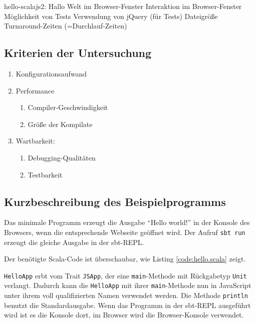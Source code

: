 \documentclass[a4paper, 12pt, hidelinks, listof=totoc, listoftables=totoc, bibliography=totoc]{scrreprt}
\begin{document}
hello-scalajs2:
Hallo Welt im Browser-Fenster
Interaktion im Browser-Fenster
Möglichkeit von Tests
Verwendung von jQuery (für Tests)
Dateigröße
Turnaround-Zeiten (=Durchlauf-Zeiten)


\subsection{Kriterien der Untersuchung}

\begin{enumerate}
	\item Konfigurationsaufwand
	\item Performance
	\begin{enumerate}
		\item Compiler-Geschwindigkeit
		\item Größe der Kompilate
	\end{enumerate}
	\item Wartbarkeit: 
		\begin{enumerate}
			\item Debugging-Qualitäten
			\item Testbarkeit
		\end{enumerate}
\end{enumerate}

\subsection{Kurzbeschreibung des Beispielprogramms}

Das minimale Programm erzeugt die Ausgabe "`Hello world!"' in der Konsole des Browsers, wenn die entsprechende Webseite geöffnet wird. Der Aufruf \texttt{sbt run} erzeugt die gleiche Ausgabe in der sbt-REPL.

Der benötigte Scala-Code ist überschaubar, wie Listing \ref{code:hello.scala} zeigt.



\texttt{HelloApp} erbt vom Trait \texttt{JSApp}, der eine \texttt{main}-Methode mit Rückgabetyp \texttt{Unit} verlangt. Dadurch kann die \texttt{HelloApp} mit ihrer \texttt{main}-Methode nun in JavaScript unter ihrem voll qualifizierten Namen verwendet werden. Die Methode \texttt{println} benutzt die Standardausgabe. Wenn das Programm in der sbt-REPL ausgeführt wird ist es die Konsole dort, im Browser wird die Browser-Konsole verwendet.
\end{document}
